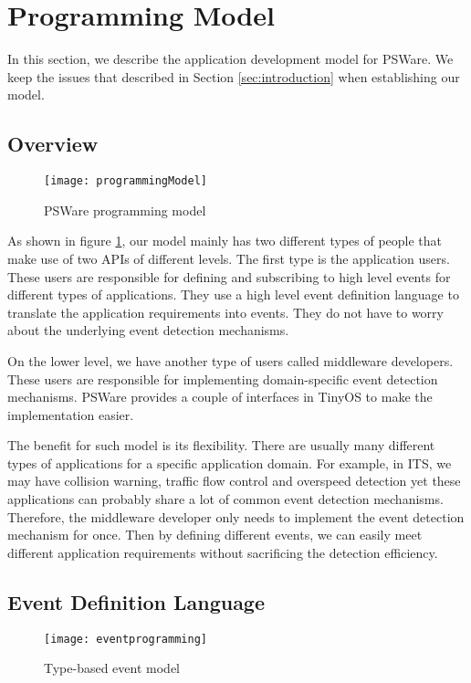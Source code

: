 \section{Programming Model}
In this section, we describe the application development model for PSWare. We keep the issues that described in Section \ref{sec:introduction} when establishing our model.

\subsection{Overview}
\begin{figure}
\centering
\texttt{[image: programmingModel]}
\caption{PSWare programming model}
\label{fig:programmingModel}
\end{figure}

As shown in figure \ref{fig:programmingModel}, our model mainly has two different types of people that make use of two APIs of different levels. The first type is the application users. These users are responsible for defining and subscribing to high level events for different types of applications. They use a high level event definition language to translate the application requirements into events. They do not have to worry about the underlying event detection mechanisms.

On the lower level, we have another type of users called middleware developers. These users are responsible for implementing domain-specific event detection mechanisms. PSWare provides a couple of interfaces in TinyOS to make the implementation easier.

The benefit for such model is its flexibility. There are usually many different types of applications for a specific application domain. For example, in ITS, we may have collision warning, traffic flow control and overspeed detection yet these applications can probably share a lot of common event detection mechanisms. Therefore, the middleware developer only needs to implement the event detection mechanism for once. Then by defining different events, we can easily meet different application requirements without sacrificing the detection efficiency.

\subsection{Event Definition Language}
\begin{figure}
\centering
\texttt{[image: eventprogramming]}
\caption{Type-based event model}
\label{fig:eventprogramming}
\end{figure}

